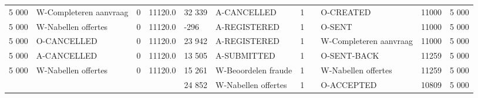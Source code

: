 \begin{tabular}{lllllllllll}
5 000 & W-Completeren aanvraag & 0 & 11120.0 & 32 339 & A-CANCELLED & 1 &  & O-CREATED & 11000 & 5 000 \\
5 000 & W-Nabellen offertes & 0 & 11120.0 & -296 & A-REGISTERED & 1 &  & O-SENT & 11000 & 5 000 \\
5 000 & O-CANCELLED & 0 & 11120.0 & 23 942 & A-REGISTERED & 1 &  & W-Completeren aanvraag & 11000 & 5 000 \\
5 000 & A-CANCELLED & 0 & 11120.0 & 13 505 & A-SUBMITTED & 1 &  & O-SENT-BACK & 11259 & 5 000 \\
5 000 & W-Nabellen offertes & 0 & 11120.0 & 15 261 & W-Beoordelen fraude & 1 &  & W-Nabellen offertes & 11259 & 5 000 \\
 &  &  &  & 24 852 & W-Nabellen offertes & 1 &  & O-ACCEPTED & 10809 & 5 000 \\
\bottomrule
\end{tabular}
